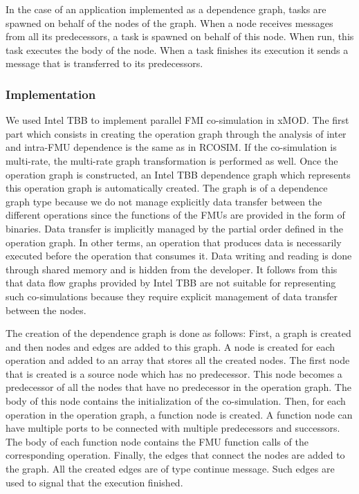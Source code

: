 In the case of an application implemented as a dependence graph, tasks are spawned on behalf of the nodes of the graph. When a node receives messages from all its predecessors, a task is spawned on behalf of this node. When run, this task executes the body of the node. When a task finishes its execution it sends a message that is transferred to its predecessors. 

\subsubsection{Implementation}

We used Intel TBB to implement parallel FMI co-simulation in xMOD. The first part which consists in creating the operation graph through the analysis of inter and intra-FMU dependence is the same as in RCOSIM. If the co-simulation is multi-rate, the multi-rate graph transformation is performed as well. Once the operation graph is constructed, an Intel TBB dependence graph which represents this operation graph is automatically created. The graph is of a dependence graph type because we do not manage explicitly data transfer between the different operations since the functions of the FMUs are provided in the form of binaries. Data transfer is implicitly managed by the partial order defined in the operation graph. In other terms, an operation that produces data is necessarily executed before the operation that consumes it. Data writing and reading is done through shared memory and is hidden from the developer. It follows from this that data flow graphs provided by Intel TBB are not suitable for representing such co-simulations because they require explicit management of data transfer between the nodes.

The creation of the dependence graph is done as follows: First, a graph is created and then nodes and edges are added to this graph. A node is created for each operation and added to an array that stores all the created nodes. The first node that is created is a source node which has no predecessor. This node becomes a predecessor of all the nodes that have no predecessor in the operation graph. The body of this node contains the initialization of the co-simulation. Then, for each operation in the operation graph, a function node is created. A function node can have multiple ports to be connected with multiple predecessors and successors. The body of each function node contains the FMU function calls of the corresponding operation. Finally, the edges that connect the nodes are added to the graph. All the created edges are of type continue message. Such edges are used to signal that the execution finished.   

